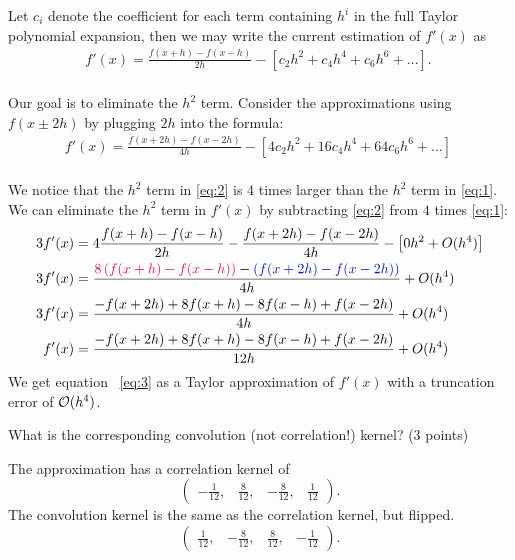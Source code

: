 \begin{problem}
\begin{enumroman}
      \begin{Answer}
        Let $c_i$ denote the coefficient for each term containing $h^i$ in the
        full Taylor polynomial expansion, then we may  write the current estimation of
        $f'(x)$ as
        \begin{align}
          f'(x) = \frac{f(x+h) - f(x-h)}{2h} - \left[ c_2 h^2 + c_4 h^4 + c_6 h^6 + \ldots \right].~\label{eq:1}
        \end{align}
        \\
        Our goal is to eliminate the $h^2$ term.
        Consider the approximations using $f(x \pm 2h)$ by plugging $2h$ into the formula:
        \begin{align}
          f'(x) = \frac{f(x+2h) - f(x-2h)}{4h} - \left[ 4c_2 h^2 + 16 c_4 h^4 + 64 c_6h^6 + \ldots \right]~\label{eq:2}
        \end{align}
        \\
        We notice that the $h^2$ term in \ref{eq:2} is $4$ times larger than the $h^2$ term in \ref{eq:1}.
        We can eliminate the $h^2$ term in $f'(x)$ by subtracting \ref{eq:2} from $4$ times \ref{eq:1}:
        \begin{align}
          3f'(x) &= 4 \frac{f(x+h) - f(x-h)}{2h} - \frac{f(x+2h) - f(x-2h)}{4h} - \left[ 0h^2 + O(h^4) \right] \nonumber \\
          3f'(x) &= \frac{\crim{8\left(f(x+h) - f(x-h)\right)} - \zaff{\left(f(x+2h) - f(x-2h)\right)}}{4h} + O(h^4 \nonumber) \\
          3f'(x) &= \frac{-f(x+2h) + 8f(x+h) -8f(x-h) + f(x-2h)}{4h} + O(h^4 \nonumber) \\
          f'(x) &= \frac{-f(x+2h) + 8f(x+h) -8f(x-h) + f(x-2h)}{12h} + O(h^4) ~\label{eq:3}
        \end{align}
        We get equation ~\ref{eq:3} as a Taylor approximation of $f'(x)$ with a truncation error
        of $\mathcal{O}(h^4)$.  
      \end{Answer}
    \newpage
    \item What is the corresponding convolution (not correlation!) kernel? (3 points)
    \begin{Answer}
      The approximation has a correlation kernel of
      \[ 
        \begin{pmatrix}
          -\frac{1}{12}, & \frac{8}{12}, & -\frac{8}{12}, & \frac{1}{12}
        \end{pmatrix}.
      \]
      The convolution kernel is the same as the correlation kernel, but flipped.
      \[
        \begin{pmatrix}
          \frac{1}{12}, & -\frac{8}{12}, & \frac{8}{12}, & -\frac{1}{12}
        \end{pmatrix}.  
      \]
    \end{Answer}

  \end{enumroman}
\end{problem}
